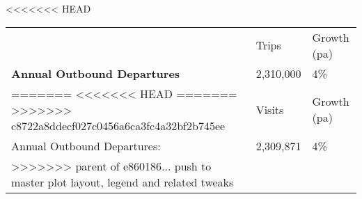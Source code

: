 <<<<<<< HEAD
\begin{tabular}[t]{p{4.7cm}>{\hfill}p{1.1cm}>{\hfill}p{1.7cm}}
   & Trips & Growth (pa) \\ 
 \textbf{Annual Outbound Departures} & 2,310,000 & 4\% \\ 
=======
<<<<<<< HEAD
=======
>>>>>>> c8722a8ddecf027c0456a6ca3fc4a32bf2b745ee
\begin{tabular}[t]{p{4.8cm}>{\hfill}p{1.3cm}>{\hfill}p{1.4cm}}
   & Visits & Growth (pa) \\ 
 Annual Outbound Departures: & 2,309,871 & 4\% \\ 
>>>>>>> parent of e860186... push to master plot layout, legend and related tweaks
  \end{tabular}
